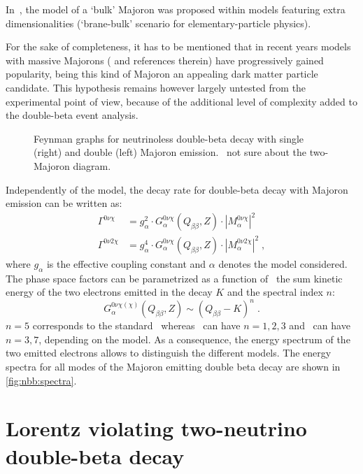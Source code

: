 In~\cite{Mohpatra2000}, the model of a `bulk' Majoron was proposed within
models featuring extra dimensionalities (`brane-bulk' scenario for
elementary-particle physics).

For the sake of completeness, it has to be mentioned that in recent years
models with massive Majorons (\cite{Blum2018} and references therein) have
progressively gained popularity, being this kind of Majoron an appealing dark
matter particle candidate. This hypothesis remains however largely untested
from the experimental point of view, because of the additional level of
complexity added to the double-beta event analysis.

\begin{figure}
  \centering%
  \caption{%
    Feynman graphs for neutrinoless double-beta decay with single (right) and
    double (left) Majoron emission. \fillme\ not sure about the two-Majoron diagram.
  }\label{fig:nbb:majfeydiag}
\end{figure}

Independently of the model, the decay rate for double-beta decay with Majoron
emission can be written as:
\begin{align*}
  \Gamma^{0\nu\chi}  &= g_\alpha^2 \cdot G_\alpha^{0\nu\chi}(Q_{\beta\beta}, Z)
    \cdot |M_\alpha^{0\nu\chi}|^2 \\
  \Gamma^{0\nu2\chi} &= g_\alpha^4 \cdot G_\alpha^{0\nu\chi}(Q_{\beta\beta}, Z)
    \cdot |M_\alpha^{0\nu2\chi}|^2 \;,
\end{align*}
where $g_\alpha$ is the effective coupling constant and $\alpha$ denotes the
model considered. The phase space factors can be parametrized as a
function of \qbb\ the sum kinetic energy of the two electrons emitted in
the decay $K$ and the spectral index $n$:
\[
  G_\alpha^{0\nu\chi(\chi)}(Q_{\beta\beta}, Z) \sim (Q_{\beta\beta} - K)^n \;.
\]
$n = 5$ corresponds to the standard \nnbb\ whereas \onbbx\ can have $n = 1, 2,
3$ and \onbbxx\ can have $n = 3, 7$, depending on the model. As a
consequence, the energy spectrum of the two emitted electrons allows to
distinguish the different models. The energy spectra for all modes of the
Majoron emitting double beta decay are shown in \cref{fig:nbb:spectra}.

\section{Lorentz violating two-neutrino double-beta decay}


